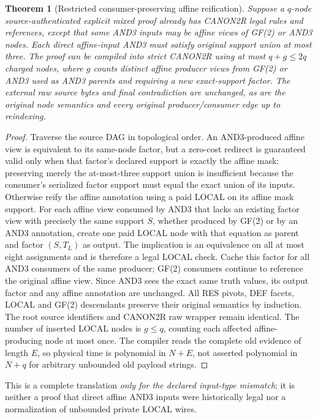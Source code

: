 \documentclass[11pt]{article}
\newtheorem{theorem}{Theorem}
\begin{document}
\begin{theorem}[Restricted consumer-preserving affine reification]
Suppose a $q$-node source-authenticated explicit mixed proof already has CANON2R legal rules and references, except that some AND3 inputs may be affine views of GF(2) or AND3 nodes. Each direct affine-input AND3 must satisfy original support union at most three. The proof can be compiled into strict CANON2R using at most $q+g\le2q$ charged nodes, where $g$ counts \emph{distinct affine producer views from GF(2) or AND3} used as AND3 parents and requiring a new exact-support factor. The external raw source bytes and final contradiction are unchanged, as are the original node semantics and every original producer/consumer edge up to reindexing.
\end{theorem}
\begin{proof}
Traverse the source DAG in topological order. An AND3-produced affine view is equivalent to its same-node factor, but a zero-cost redirect is guaranteed valid only when that factor's declared support is exactly the affine mask: preserving merely the at-most-three support union is insufficient because the consumer's serialized factor support must equal the exact union of its inputs. Otherwise reify the affine annotation using a paid LOCAL on its affine mask support. For each affine view consumed by AND3 that lacks an existing factor view with precisely the same support $S$, whether produced by GF(2) or by an AND3 annotation, create one paid LOCAL node with that equation as parent and factor $(S,T_L)$ as output. The implication is an equivalence on all at most eight assignments and is therefore a legal LOCAL check. Cache this factor for all AND3 consumers of the same producer; GF(2) consumers continue to reference the original affine view. Since AND3 sees the exact same truth values, its output factor and any affine annotation are unchanged. All RES pivots, DEF facets, LOCAL and GF(2) descendants preserve their original semantics by induction. The root source identifiers and CANON2R raw wrapper remain identical. The number of inserted LOCAL nodes is $g\le q$, counting each affected affine-producing node at most once. The compiler reads the complete old evidence of length $E$, so physical time is polynomial in $N+E$, not asserted polynomial in $N+q$ for arbitrary unbounded old payload strings.
\end{proof}
This is a complete translation \emph{only for the declared input-type mismatch}; it is neither a proof that direct affine AND3 inputs were historically legal nor a normalization of unbounded private LOCAL wires.
\end{document}
